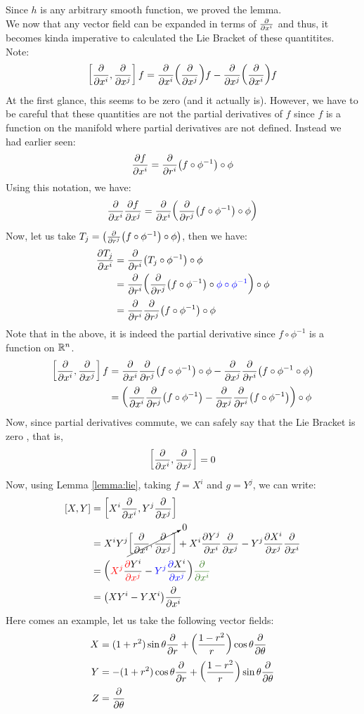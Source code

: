 Since $h$ is any arbitrary smooth function, we proved the lemma.\\[0.2cm]
We now that any vector field can be expanded in terms of $\pdv{x^i}$ and thus, it becomes kinda imperative to calculated the Lie Bracket of these quantitites. Note:
$$\left[ \pdv{x^i}, \pdv{x^j} \right]f =\pdv{x^i}\qty(\pdv{x^j})f - \pdv{x^j}\qty(\pdv{x^i})f $$ 
At the first glance, this seems to be zero (and it actually is). However, we have to be careful that these quantities are not the partial derivatives of $f$ since $f$ is a function on the manifold where partial derivatives are not defined. Instead we had earlier seen:
$$\pdv{f}{x^i} = \pdv{r^i}\qty(f\circ \phi^{-1})\circ \phi$$
Using this notation, we have:
\begin{align*}
  \pdv{x^i}\pdv{f}{x^j} = \pdv{x^i}\qty(\pdv{r^j}\qty(f\circ \phi^{-1})\circ \phi)
\end{align*}
Now, let us take $T_j = {\qty(\pdv{r^j}\qty(f\circ \phi^{-1})\circ \phi)}$, then we have:
\begin{align*}
  \pdv{T_j}{x^i} &= \pdv{r^i}\qty({T_j}\circ \phi^{-1})\circ \phi\\
  &= \pdv{r^i}\qty(\pdv{r^j}\qty(f\circ \phi^{-1})\circ \mathcolor{blue}{\phi\circ \phi^{-1}})\circ\phi\\
  &= \pdv{r^i}\pdv{r^j}\qty(f\circ \phi^{-1})\circ\phi
\end{align*}
Note that in the above, it is indeed the partial derivative since $f\circ \phi^{-1}$ is a function on $\mathbb{R}^n$.
\begin{align*}
  \left[ \pdv{x^i}, \pdv{x^j} \right]f  &= \pdv{x^i}\pdv{r^j}\qty(f\circ \phi^{-1})\circ \phi - \pdv{x^j}\pdv{r^i}\qty(f\circ \phi^{-1}\circ \phi)\\
  &=\qty(\pdv{x^i}\pdv{r^j}\qty(f\circ \phi^{-1})-\pdv{x^j}\pdv{r^i}\qty(f\circ \phi^{-1}))\circ \phi
\end{align*}
Now, since partial derivatives commute, we can safely say that the Lie Bracket is zero , that is,
$$\left[ \pdv{x^i}, \pdv{x^j} \right] = 0$$ Now, using Lemma \ref{lemma:lie}, taking $f=X^i$ and $g = Y^j$, we can write:
\begin{align*}
  \comtr{X}{Y} &= \comtr{X^i \pdv{x^i}}{ Y^j \pdv{x^j}}\\
&=X^i Y^j \cancelto{0}{\comtr{\pdv{x^i}}{\pdv{x^j}}}+X^i\pdv{Y^j}{x^i}\pdv{x^j} - Y^j\pdv{X^i}{x^j}\pdv{x^i}\\
&=\qty(\mathcolor{red}{X^j}\frac{\mathcolor{red}{\partial} Y^i}{\mathcolor{red}{\partial x^j}}- \mathcolor{blue}{Y^j}\frac{\mathcolor{blue}{\partial} X^i}{\mathcolor{blue}{\partial x^j}})\mathcolor{OliveGreen}{\pdv{x^i}}\\
&=\qty(XY^i - YX^i)\pdv{x^i}
\end{align*}
Here comes an example,  let us take the following vector fields: 
\begin{align*}
  X &= (1+r^2)\sin\theta\pdv{r} + \qty(\frac{1-r^2}{r})\cos\theta\pdv{\theta}\\
Y&=-(1+r^2)\cos\theta\pdv{r} +\qty(\frac{1-r^2}{r})\sin\theta\pdv{\theta}\\
Z&=\pdv{\theta}
\end{align*}

